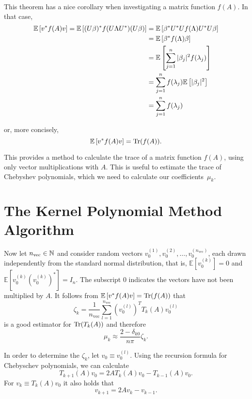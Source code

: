 This theorem has a nice corollary when investigating a matrix function $f(A)$.
In that case,
\begin{align*}
    \mathbb{E}\left[v^* f(A) v\right] = \mathbb{E}\left[(U\beta)^* f(U\Lambda U^*) (U\beta)\right] &= \mathbb{E}\left[\beta^* U^* U f(\Lambda) U^* U \beta\right] \\
    &= \mathbb{E}\left[\beta^* f(\Lambda) \beta\right] \\
    &= \mathbb{E}\left[\sum_{j = 1}^n |\beta_j|^2 f(\lambda_j) \right] \\
    &= \sum_{j = 1}^n f(\lambda_j) \mathbb{E}\left[ |\beta_j|^2 \right] \\
    &= \sum_{j = 1}^n f(\lambda_j)
\end{align*}

or, more concisely,
\[
    \mathbb{E}\left[v^* f(A) v\right] = \operatorname{Tr}(f(A)).
\]

This provides a method to calculate the trace of a matrix function $f(A)$, using only vector multiplications with $A$. This is useful to estimate the trace of Chebyshev polynomials, which we need to calculate our coefficients~$\mu_k$.

\section{The Kernel Polynomial Method Algorithm}

Now let $n_{\text{vec}} \in \mathbb{N}$ and consider random vectors $v_0^{(1)}, v_0^{(2)}, \dots, v_0^{(n_{\text{vec}})}$, each drawn independently from the standard normal distribution, that is, $\mathbb{E}[v_0^{(k)}] = 0$ and $\mathbb{E}\left[v_0^{(k)} \left(v_0^{(k)}\right)^*\right] = I_n$. The subscript $0$ indicates the vectors have not been multiplied by $A$. It follows from $\mathbb{E}\left[v^* f(A) v\right] = \operatorname{Tr}(f(A))$ that
\[
\zeta_k = \frac{1}{n_{\text{vec}}} \sum_{l = 1}^{n_{\text{vec}}} \left( v_0^{(l)} \right)^T T_k(A) v_0^{(l)}
\]
is a good estimator for $\operatorname{Tr}(T_k(A))$ and therefore
\[
\mu_k \approx \frac{2 - \delta_{k0}}{n \pi} \zeta_k.
\]

In order to determine the $\zeta_k$, let $v_0 \equiv v_0^{(l)}$.
Using the recursion formula for Chebyschev polynomials, we can calculate
\[
T_{k + 1}(A)v_0 = 2 A T_k(A) v_0 - T_{k - 1}(A) v_0.
\]
For $v_k \equiv T_k(A)v_0$ it also holds that
\[
v_{k + 1} = 2 A v_k - v_{k - 1}.
\]

